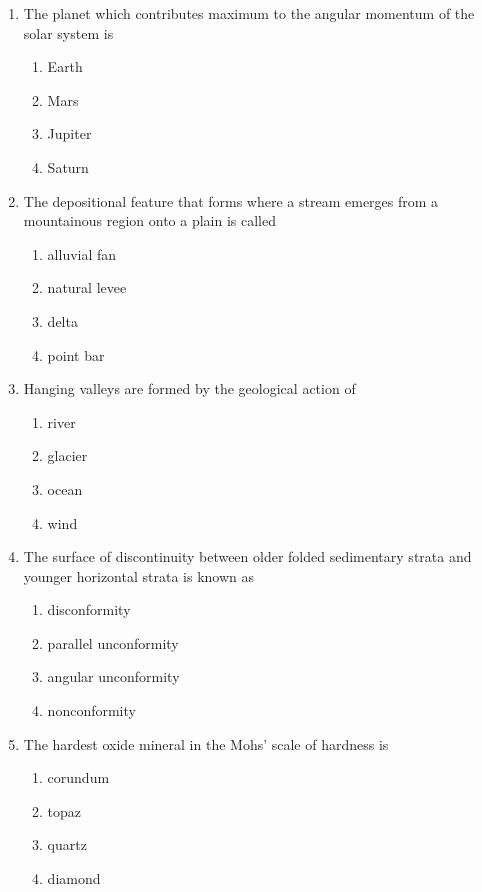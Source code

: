 \documentclass[journal,12pt,onecolumn]{IEEEtran}
\theoremstyle{remark}
\begin{document}
\begin{enumerate}
\item The planet which contributes maximum to the angular momentum of the solar system is
\begin{multicols}{4}
\begin{enumerate}
\item Earth  
\item Mars  
\item Jupiter  
\item Saturn  
\end{enumerate}
\end{multicols}

\item The depositional feature that forms where a stream emerges from a mountainous region onto a plain is called
\begin{multicols}{2}
\begin{enumerate}
\item alluvial fan  
\item natural levee  
\item delta  
\item point bar  
\end{enumerate}
\end{multicols}

\item Hanging valleys are formed by the geological action of
\begin{multicols}{4}
\begin{enumerate}
\item river  
\item glacier  
\item ocean  
\item wind  
\end{enumerate}
\end{multicols}

\item The surface of discontinuity between older folded sedimentary strata and younger horizontal strata is known as
\begin{multicols}{2}
\begin{enumerate}
\item disconformity  
\item parallel unconformity  
\item angular unconformity  
\item nonconformity  
\end{enumerate}
\end{multicols}

\item The hardest oxide mineral in the Mohs' scale of hardness is
\begin{multicols}{4}
\begin{enumerate}
\item corundum  
\item topaz  
\item quartz  
\item diamond  
\end{enumerate}
\end{multicols}


\end{enumerate}
\end{document}
